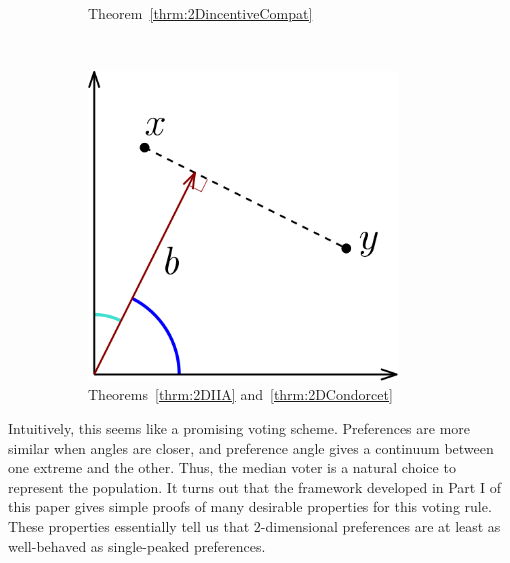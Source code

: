 \documentclass[12pt]{article}
\newcommand{\1}[1]{\mathds{1}[{#1}]}
\begin{document}
\begin{figure}[h]
\begin{subfigure}[t]{0.3\textwidth}
      \caption{Theorem~\ref{thrm:2DincentiveCompat}}
      \label{fig:tiger}
    \end{subfigure}
    ~
    \begin{subfigure}[t]{0.3\textwidth}
      \includegraphics[width=0.9\textwidth]{figures/thrmIIA}
      \caption{Theorems~\ref{thrm:2DIIA} and~\ref{thrm:2DCondorcet}}
      \label{fig:domHull}
    \end{subfigure}

    \caption{}\label{fig:animals}
  \end{figure}

  Intuitively, this seems like a promising voting scheme.
  Preferences are more similar when angles are closer,
  and preference angle gives a continuum between one extreme and the other.
  Thus, the median voter is a natural choice to represent the population.
  It turns out that the framework developed in Part I of this paper gives
  simple proofs of many desirable properties for this voting rule.
  These properties essentially tell us that $2$-dimensional preferences are at
  least as well-behaved as single-peaked preferences.
\end{document}
